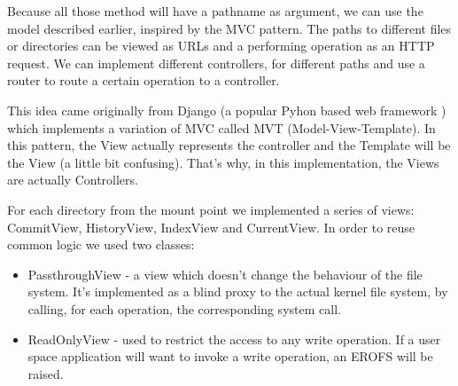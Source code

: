 Because all those method will have a pathname as argument, we can use the model described earlier, inspired by the MVC pattern. The paths to different files or directories can be viewed as URLs and a performing operation as an HTTP request. We can implement different controllers, for different paths and use a router to route a certain operation to a controller.

This idea came originally from Django (a popular Pyhon based web framework \cite{Django}) which implements a variation of MVC called MVT (Model-View-Template). In this pattern, the View actually represents the controller and the Template will be the View (a little bit confusing). That's why, in this implementation, the Views are actually Controllers.

For each directory from the mount point we implemented a series of views: CommitView, HistoryView, IndexView and CurrentView. In order to reuse common logic we used two classes:

\begin{itemize}
    \item PassthroughView - a view which doesn't change the behaviour of the file system. It's implemented as a blind proxy to the actual kernel file system, by calling, for each operation, the corresponding system call.
    \item ReadOnlyView - used to restrict the access to any write operation. If a user space application will want to invoke a write operation, an EROFS \cite{erofs} will be raised.
\end{itemize}

